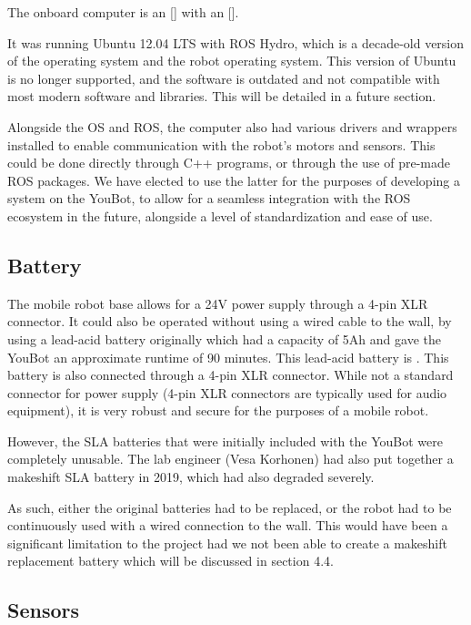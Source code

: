 \documentclass[a4paper, 12pt]{article}
\newif\ifshownotes
\newcommand{\notes}[1]{\ifshownotes\textcolor{blue}{#1}\fi}
\begin{document}
    \notes{what ports are there? what software is on there? ubuntu? initial setup? ROS version? software?}
    The onboard computer is an [] with an []. 

    It was running Ubuntu 12.04 LTS with ROS Hydro, which is a decade-old version of the operating system and the robot operating system. This version of Ubuntu is no longer supported, and the software is outdated and not compatible with most modern software and libraries. This will be detailed in a future section.

    Alongside the OS and ROS, the computer also had various drivers and wrappers installed to enable communication with the robot's motors and sensors. This could be done directly through C++ programs, or through the use of pre-made ROS packages. We have elected to use the latter for the purposes of developing a system on the YouBot, to allow for a seamless integration with the ROS ecosystem in the future, alongside a level of standardization and ease of use. 


    \subsection{Battery}
    
    The mobile robot base allows for a 24V power supply through a 4-pin XLR connector. It could also be operated without using a wired cable to the wall, by using a lead-acid battery originally which had a capacity of 5Ah and gave the YouBot an approximate runtime of 90 minutes. This lead-acid battery is \notes{[dimensions here]}. This battery is also connected through a 4-pin XLR connector. While not a standard connector for power supply (4-pin XLR connectors are typically used for audio equipment), it is very robust and secure for the purposes of a mobile robot. 

    However, the SLA batteries that were initially included with the YouBot were completely unusable. The lab engineer (Vesa Korhonen) had also put together a makeshift SLA battery in 2019, which had also degraded severely. 

    As such, either the original batteries had to be replaced, or the robot had to be continuously used with a wired connection to the wall. This would have been a significant limitation to the project had we not been able to create a makeshift replacement battery which will be discussed in section 4.4.
    

    \subsection{Sensors}
    
\end{document}
